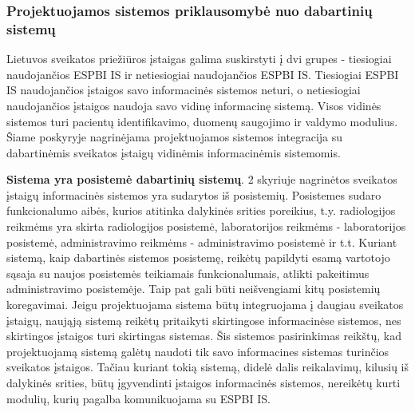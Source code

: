 \subsubsection{Projektuojamos sistemos priklausomybė nuo dabartinių sistemų}
Lietuvos sveikatos priežiūros įstaigas galima suskirstyti į dvi grupes - tiesiogiai naudojančios ESPBI IS ir netiesiogiai naudojančios ESPBI IS. Tiesiogiai ESPBI IS naudojančios įstaigos savo informacinės sistemos neturi, o netiesiogiai naudojančios įstaigos naudoja savo vidinę informacinę sistemą. Visos vidinės sistemos turi pacientų identifikavimo, duomenų saugojimo ir valdymo modulius. Šiame poskyryje nagrinėjama projektuojamos sistemos integracija su dabartinėmis sveikatos įstaigų vidinėmis informacinėmis sistemomis.

\textbf{Sistema yra posistemė dabartinių sistemų}. 2 skyriuje nagrinėtos sveikatos įstaigų informacinės sistemos yra sudarytos iš posistemių. Posistemes sudaro funkcionalumo aibės, kurios atitinka dalykinės srities poreikius, t.y. radiologijos reikmėms yra skirta radiologijos posistemė, laboratorijos reikmėms - laboratorijos posistemė, administravimo reikmėms - administravimo posistemė ir t.t. Kuriant sistemą, kaip dabartinės sistemos posistemę, reikėtų papildyti esamą vartotojo sąsaja su naujos posistemės teikiamais funkcionalumais, atlikti pakeitimus administravimo posistemėje. Taip pat gali būti neišvengiami kitų posistemių koregavimai. Jeigu projektuojama sistema būtų integruojama į daugiau sveikatos įstaigų, naująją sistemą reikėtų pritaikyti skirtingose informacinėse sistemos, nes skirtingos įstaigos turi skirtingas sistemas. Šis sistemos pasirinkimas reikštų, kad projektuojamą sistemą galėtų naudoti tik savo informacines sistemas turinčios sveikatos įstaigos. Tačiau kuriant tokią sistemą, didelė dalis reikalavimų, kilusių iš dalykinės srities, būtų įgyvendinti įstaigos informacinės sistemos, nereikėtų kurti modulių, kurių pagalba komunikuojama su ESPBI IS.

